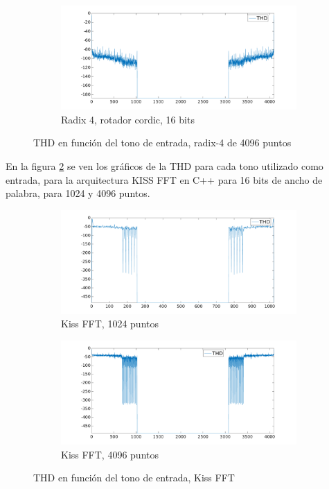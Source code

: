 \begin{figure}[htbp!]
\begin{subfigure}{0.6\textwidth}
        \includegraphics[width=9cm]{./figures/thd_r4_4096_16_cor.png}
        \caption{Radix 4, rotador cordic, 16 bits}
        \end{subfigure} 
        \caption{THD en función del tono de entrada, radix-4 de 4096 puntos}
        \label{fig:r4_thd_4096}
\end{figure}

En la figura \ref{fig:kiss_thd_4096} se ven los gráficos de la THD para cada tono utilizado como
entrada, para la arquitectura KISS FFT en C++ para 16 bits de
ancho de palabra, para 1024 y 4096 puntos.

\begin{figure}[htbp!]
        \advance\leftskip-1.5cm
        \begin{subfigure}{0.6\textwidth}%
        \includegraphics[width=9cm]{./figures/thd_kiss_1024_16.png}
        \caption{Kiss FFT, 1024 puntos}
        \end{subfigure}%
        \begin{subfigure}{0.6\textwidth}%
        \includegraphics[width=9cm]{./figures/thd_kiss_4096_16.png}
        \caption{Kiss FFT, 4096 puntos}
        \end{subfigure}
        \caption{THD en función del tono de entrada, Kiss FFT}
        \label{fig:kiss_thd_4096}
\end{figure}

